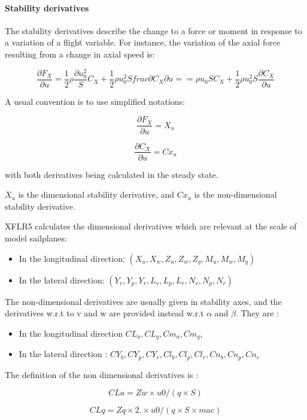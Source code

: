 \documentclass[a4paper,twoside,12pt,dvips]{article}
\begin{document}
\paragraph{Stability derivatives}

The stability derivatives describe the change to a force or moment in
response to a variation of a flight variable. For instance, the
variation of the axial force resulting from a change in axial speed
is:

$$\frac{\partial F_X}{\partial u} = 
\frac{1}{2}\rho \frac{\partial u_{0}^{2}} S C_X + 
\frac{1}{2}\rho u_{0}^{2} S frac{\partial C_X}{\partial u} =
= \rho u_{0} S C_{X} +
\frac{1}{2} \rho u_{0}^{2} S \frac{\partial C_{X}}{\partial u}$$

A usual convention is to use simplified notations:

$$\frac{\partial F_X}{\partial u} = X_u$$

$$\frac{\partial C_X}{\partial u} = Cx_u$$

with both derivatives being calculated in the steady state.

$X_u$ is the dimensional stability derivative, and
$Cx_u$ is the non-dimensional stability derivative.

XFLR5 calculates the dimensional derivatives which are relevant at the
scale of model sailplanes:

\begin{itemize}
\item In the longitudinal direction: $(X_u, X_w, Z_u, Z_w, Z_q, M_u, M_w, M_q)$
\item In the lateral direction: $(Y_v, Y_p, Y_r, L_v, L_p, L_r, N_v, N_p, N_r)$
\end{itemize}

The non-dimensional derivatives are usually given in stability axes, and
the derivatives w.r.t to v and w are provided instead w.r.t
$\alpha$ and $\beta$. They are :

\begin{itemize}
\item In the longitudinal direction $CL_a, CL_q, Cm_a, Cm_q$,
\item In the lateral direction : $CY_b, CY_p, CY_r, Cl_b, Cl_p, Cl_r, Cn_b, Cn_p, Cn_r$
\end{itemize}

The definition of the non dimensional derivatives is :

$$CLa = Zw \times u0  / (q \times S)$$

$$CLq = Zq \times 2. \times u0 / (q \times S \times mac)$$
\end{document}
